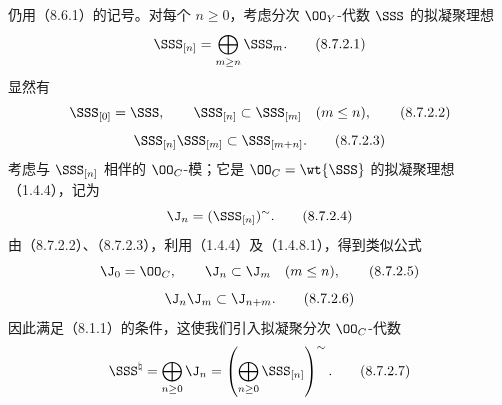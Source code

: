 仍用（8.6.1）的记号。对每个 $n\geq0$，考虑分次 $\OO_Y$-代数 $\SSS$ 的拟凝聚理想
\begin{equation}
\SSS_{[n]}=\bigoplus_{m\geq n}\SSS_m.
\tag{8.7.2.1}
\end{equation}
显然有
\begin{equation}
\SSS_{[0]}=\SSS,\qquad \SSS_{[n]}\subset\SSS_{[m]}\quad(m\leq n),
\tag{8.7.2.2}
\end{equation}
\begin{equation}
\SSS_{[n]}\SSS_{[m]}\subset\SSS_{[m+n]}.
\tag{8.7.2.3}
\end{equation}
考虑与 $\SSS_{[n]}$ 相伴的 $\OO_C$-模；它是 $\OO_C=\wt{\SSS}$ 的拟凝聚理想（1.4.4），记为
\begin{equation}
\J_n=(\SSS_{[n]})^{\sim}.
\tag{8.7.2.4}
\end{equation}
由（8.7.2.2）、（8.7.2.3），利用（1.4.4）及（1.4.8.1），得到类似公式
\begin{equation}
\J_0=\OO_C,\qquad \J_n\subset\J_m\quad(m\leq n),
\tag{8.7.2.5}
\end{equation}
\begin{equation}
\J_n\J_m\subset\J_{n+m}.
\tag{8.7.2.6}
\end{equation}
因此满足（8.1.1）的条件，这使我们引入拟凝聚分次 $\OO_C$-代数
\begin{equation}
\SSS^{\natural}=\bigoplus_{n\geq0}\J_n
=\left(\bigoplus_{n\geq0}\SSS_{[n]}\right)^{\sim}.
\tag{8.7.2.7}
\end{equation}

